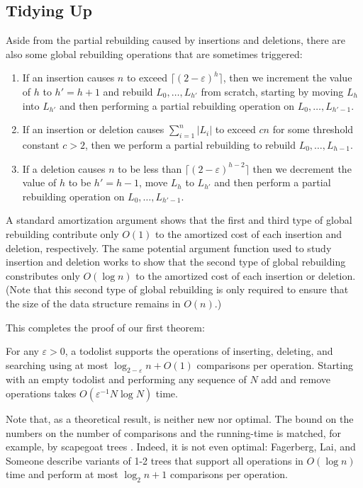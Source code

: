 \documentclass[lotsofwhite]{patmorin}
\newcommand{\eps}{\varepsilon}
\begin{document}
\subsection{Tidying Up}

Aside from the partial rebuilding caused by insertions and deletions, there are also some global rebuilding operations that are sometimes triggered:
\begin{enumerate}
\item If an insertion causes $n$ to exceed $\lceil(2-\eps)^h\rceil$, then
we increment the value of $h$ to $h'=h+1$ and rebuild $L_0,\ldots,L_{h'}$
from scratch, starting by moving $L_h$ into $L_{h'}$ and then performing
a partial rebuilding operation on $L_{0},\ldots,L_{h'-1}$.
\item If an insertion or deletion causes $\sum_{i=1}^n |L_i|$ to exceed $cn$ for some threshold constant $c>2$, then we perform a partial rebuilding to rebuild $L_{0},\ldots,L_{h-1}$.
\item If a deletion causes $n$ to be less than $\lceil(2-\eps)^{h-2}\rceil$ then we decrement the value of $h$ to be $h'=h-1$, move $L_h$ to $L_{h'}$ and then perform a partial rebuilding operation on $L_{0},\ldots,L_{h'-1}$. 
\end{enumerate}

A standard amortization argument shows that the first and third type
of global rebuilding contribute only $O(1)$ to the amortized cost of
each insertion and deletion, respectively.  The same potential argument
function used to study insertion and deletion works to show that the
second type of global rebuilding constributes only $O(\log n)$ to the
amortized cost of each insertion or deletion.  (Note that this second
type of global rebuilding is only required to ensure that the size of
the data structure remains in $O(n)$.)

This completes the proof of our first theorem:

\begin{thm}
For any $\eps >0$, a todolist supports the operations of inserting,
deleting, and searching using at most $\log_{2-\eps} n + O(1)$ comparisons
per operation.  Starting with an empty todolist and performing any
sequence of $N$ add and remove operations takes $O(\eps^{-1}N\log
N)$ time.
\end{thm}

Note that, as a theoretical result,  is neither new
nor optimal.  The bound on the numbers on the number of comparisons
and the running-time is matched, for example, by scapegoat trees
\cite{galperin.rivest:blah,andersson:blah}.  Indeed, it is not even
optimal: Fagerberg, Lai, and Someone describe variants of 1-2 trees that
support all operations in $O(\log n)$ time and perform at most $\log_2
n + 1$ comparisons per operation.
\end{document}
